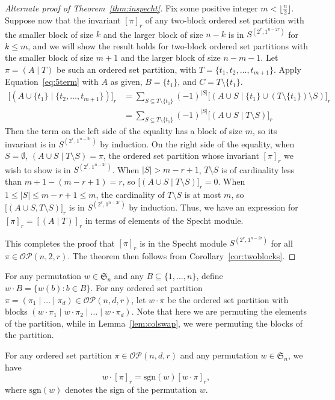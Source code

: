 \documentclass[ALCO, Unicode]{cedram}
\numberwithin{equation}{section}
\newcommand{\sgn}{\mathrm{sgn}}
\newcommand{\ordsetpart}{\mathcal{OP}}
\begin{document}
\begin{proof}[Alternate proof of Theorem~\ref{thm:inspecht}]
Fix some positive integer $m< \lfloor\frac{n}{2}\rfloor$. Suppose now that the invariant $[\pi]_r$ of any two-block ordered set partition with the smaller block of size $k$ and the larger block of size $n-k$ is in $S^{(2^r,1^{n-2r})}$ for $k\leq m$, and we will show the result holds for two-block ordered set partitions with the smaller block of size $m+1$ and the larger block of size $n-m-1$. 
Let $\pi=(A \mid T)$ be such an ordered set partition, with $T=\{t_1,t_2,\ldots,t_{m+1}\}$.  
Apply Equation~\eqref{eq:5term} with $A$ as given, $B=\{t_1\}$, and $C=T\setminus \{t_1\}$.
\begin{align*}
\big[(A\cup \{t_1\} \mid \{t_2,\ldots,t_{m+1}\})\big]_r&=\sum_{S\subseteq T\setminus \{t_1\}}(-1)^{|S|}\big[(A\cup S \mid \{t_1\}\cup (T\setminus \{t_1\})\setminus S)\big]_r\\
&=\sum_{S\subseteq T\setminus \{t_1\}}(-1)^{|S|}\big[(A\cup S \mid T\setminus S ) \big]_r
\end{align*}
Then the term on the left side of the equality has a block of size $m$, so its invariant is in $S^{(2^r,1^{n-2r})}$ by induction. On the right side of the equality, when $S=\emptyset$, $(A\cup S\mid T\setminus S)=\pi$, the ordered set partition whose invariant $[\pi]_r$ we wish to show is in $S^{(2^r,1^{n-2r})}$. When $|S|>m-r+1$, $T\setminus S$ is of cardinality less than $m+1-(m-r+1)=r$, so $\big[(A\cup S\mid T\setminus S)\big]_r=0$. When $1\leq |S|\leq m-r+1\leq m$, the cardinality of $T\setminus S$ is at most $m$, so $\big[(A\cup S,T\setminus S)\big]_r$ is in $S^{(2^r,1^{n-2r})}$ by induction. Thus, we have an expression for $[\pi]_r=[(A\mid T)]_r$ in terms of elements of the Specht module. 

This completes the proof that $[\pi]_r$ is in the Specht module $S^{(2^r,1^{n-2 r})}$ for all $\pi\in\ordsetpart(n,2,r)$. The theorem then follows from Corollary~\ref{cor:twoblocks}.
\end{proof}

For any permutation $w \in \mathfrak{S}_n$ and any $B \subseteq \{1, \dots, n\}$, define $w \cdot B = \{ w(b) : b \in B \}$.
For any ordered set partition $\pi = (\pi_1\mid  \dots\mid \pi_d ) \in \ordsetpart(n,d,r)$, let $w \cdot \pi$ be the ordered set partition with blocks $( w \cdot \pi_1\mid w \cdot \pi_2\mid \dots\mid w \cdot \pi_d )$. Note that here we are permuting the elements of the partition, while in Lemma~\ref{lem:colswap}, we were permuting the blocks of the partition.


\begin{proposition}
\label{prop:any_perm}
For any ordered set partition $\pi \in \ordsetpart(n,d,r)$ and any permutation $w \in \mathfrak{S}_n$, we have 
\[
w \cdot [\pi]_r = \sgn(w) [w \cdot \pi]_r,
\]
where $\sgn(w)$ denotes the sign of the permutation $w$.
\end{proposition}
\end{document}
